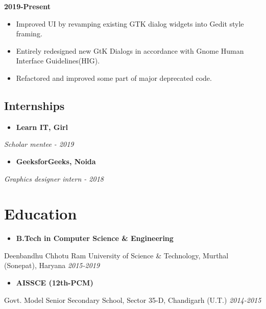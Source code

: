 \documentclass[]{article}
\let\oldhref\href
\renewcommand{\href}[3][blue]{\oldhref{#2}{\color{#1}{#3}}}
\providecommand{\tightlist}{%
  \setlength{\itemsep}{0pt}\setlength{\parskip}{0pt}}
\begin{document}
\textbf{2019-Present}

\begin{itemize}
\tightlist
\item
  Improved UI by revamping existing GTK dialog widgets into Gedit style
  framing.
\item
  Entirely redesigned new GtK Dialogs in accordance with Gnome Human
  Interface Guidelines(HIG).
\item
  Refactored and improved some part of major deprecated code.
\end{itemize}

\hypertarget{internships}{%
\subsection{Internships}\label{internships}}

\begin{itemize}
\tightlist
\item
  \textbf{Learn IT, Girl}
  \href{https://www.credential.net/bv0kk4cq}{(Certificate)}
\end{itemize}

\emph{Scholar mentee - 2019}

\begin{itemize}
\tightlist
\item
  \textbf{GeeksforGeeks, Noida}
  \href{https://media.geeksforgeeks.org/wp-content/cdn-uploads/Priyanka-Saggu-1.jpg}{(Certificate)}
\end{itemize}

\emph{Graphics designer intern - 2018}

\hypertarget{education}{%
\section{Education}\label{education}}

\begin{itemize}
\tightlist
\item
  \textbf{B.Tech in Computer Science \& Engineering}
\end{itemize}

Deenbandhu Chhotu Ram University of Science \& Technology, Murthal
(Sonepat), Haryana \emph{2015-2019}

\begin{itemize}
\tightlist
\item
  \textbf{AISSCE (12th-PCM)}
\end{itemize}

Govt. Model Senior Secondary School, Sector 35-D, Chandigarh (U.T.)
\emph{2014-2015}
\end{document}
